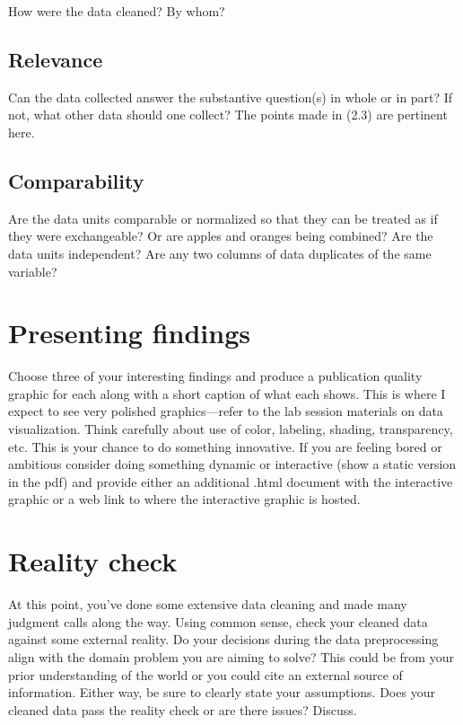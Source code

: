 \documentclass[10pt,letterpaper]{article}
\begin{document}
How were the data cleaned? By whom?

\subsection*{Relevance}

Can the data collected answer the substantive question(s) in whole or in part? If not, what other data should one collect? The points made in (2.3) are pertinent here.

\subsection*{Comparability}

Are the data units comparable or normalized so that they can be treated as if they were exchangeable? Or are apples and oranges being combined? Are the data units independent? Are any two columns of data duplicates of the same variable?

\section*{Presenting findings}

Choose three of your interesting findings and produce a publication quality graphic for each along with a short caption of what each shows. This is where I expect to see very polished graphics---refer to the lab session materials on data visualization. Think carefully about use of color, labeling, shading, transparency, etc. This is your chance to do something innovative. If you are feeling bored or ambitious consider doing something dynamic or interactive (show a static version in the pdf) and provide either an additional .html document with the interactive graphic or a web link to where the interactive graphic is hosted.

\section*{Reality check}

At this point, you’ve done some extensive data cleaning and made many judgment calls along the way. Using common sense, check your cleaned data against some external reality. Do your decisions during the data preprocessing align with the domain problem you are aiming to solve? This could be from your prior understanding of the world or you could cite an external source of information. Either way, be sure to clearly state your assumptions. Does your cleaned data pass the reality check or are there issues? Discuss.
\end{document}
